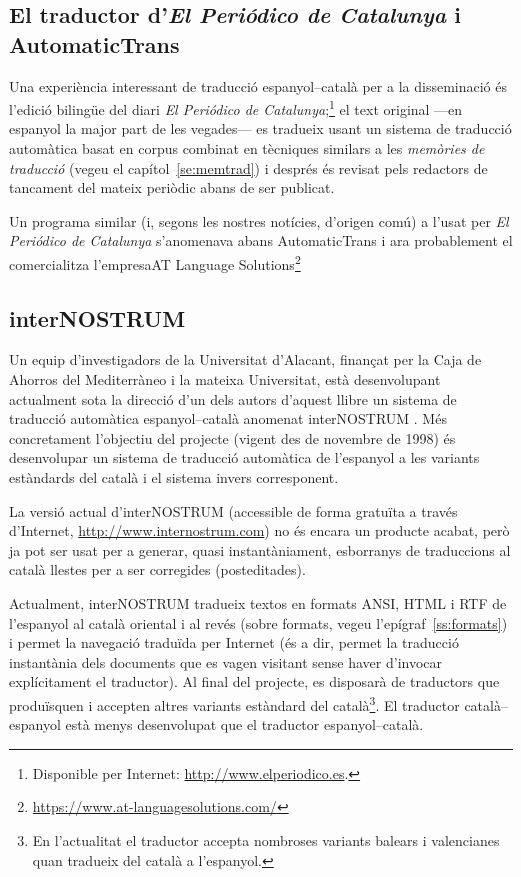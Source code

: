 \subsection{El traductor d'\emph{El Periódico de Catalunya} i AutomaticTrans}
\label{ss:ePdC}

Una experiència interessant \citep{fiteperiodico} de traducció
espanyol--català per a la disseminació és l'edició bilingüe del diari
\emph{El Periódico de Catalunya};\footnote{Disponible per Internet:
  \url{http://www.elperiodico.es}.} el text original ---en espanyol
la major part de les vegades--- es tradueix usant un sistema de
traducció automàtica basat en corpus combinat en tècniques similars a
les \emph{memòries de traducció} (vegeu el capítol~\ref{se:memtrad}) i
després és revisat pels redactors de tancament del mateix periòdic
abans de ser publicat.

Un programa similar (i, segons les nostres notícies, d'origen comú) a
l'usat per \emph{El Periódico de Catalunya} s'anomenava abans
AutomaticTrans i ara probablement el comercialitza l'empresaAT
Language
Solutions\footnote{\url{https://www.at-languagesolutions.com/}}


\subsection{interNOSTRUM}

Un equip d'investigadors de la Universitat d'Alacant, finançat per la
Caja de Ahorros del Mediterràneo i la mateixa Universitat, està
desenvolupant actualment sota la direcció d'un dels autors d'aquest
llibre un sistema de traducció automàtica espanyol--català anomenat
\textsf{interNOSTRUM} \citep{canals01a,canals01b}. Més concretament
l'objectiu del projecte (vigent des de novembre de 1998) és
desenvolupar un sistema de traducció automàtica de l'espanyol a les
variants estàndards del català i el sistema invers corresponent.

La versió actual d'{\sf interNOSTRUM} (accessible de forma gratuïta a
través d'Internet, \url{http://www.internostrum.com}) no és encara un
producte acabat, però ja pot ser usat per a generar, quasi
instantàniament, esborranys de traduccions al català llestes per a ser
corregides (posteditades).

Actualment, {\sf interNOSTRUM} tradueix textos en formats ANSI, HTML i
RTF de l'espanyol al català oriental i al revés (sobre formats, vegeu
l'epígraf~\ref{ss:formats}) i permet la navegació traduïda per
Internet (és a dir, permet la traducció instantània dels documents que
es vagen visitant sense haver d'invocar explícitament el traductor).
Al final del projecte, es disposarà de traductors que produïsquen i
accepten altres variants estàndard del català\footnote{En l'actualitat
  el traductor accepta nombroses variants balears i valencianes quan
  tradueix del català a l'espanyol.}. El traductor català--espanyol
està menys desenvolupat que el traductor espanyol--català.

